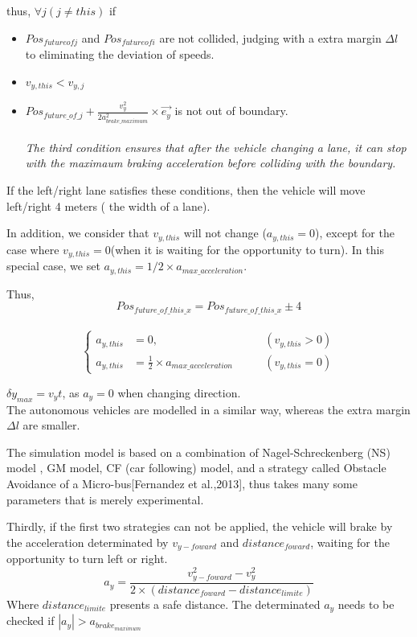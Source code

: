 \documentclass{mcmthesis}
\begin{document}
thus, $\forall j  (j \neq this) $ if
\begin{itemize}
		\item $Pos_{future of j}$ and $ Pos_{future of i}$ are not collided, judging with a extra margin $\Delta l$ to eliminating the deviation of speeds.
		\item $v_{y,this} < v_{y,j} $
		\item $Pos_{future \_ of \_ j} + \frac{v_y^2}{2a_{brake \_ maximum}^2} \times \overrightarrow{e_y}$ is not out of boundary.
		\\ \\ \emph{The third condition ensures that after the vehicle changing a lane, it can stop with the maximaum braking acceleration before colliding with the boundary. }
\end{itemize}

If the left/right lane satisfies these conditions, then the vehicle will move left/right 4 meters ( the width of a lane).


In addition, we consider that $v_{y,this}$ will not change ($a_{y,this} = 0$), except for the case where $v_{y,this} = 0$(when it is waiting for the opportunity to turn). In this special case, we set $a_{y,this} = 1/2 \times a_{max \_ acceleration}$.

Thus, \\
$$Pos_{future\_of\_this\_x} = Pos_{future\_of\_this\_x} \pm 4$$\\
$$\left\{ 
\begin{aligned}
a_{y,this} &= 0 ,   \qquad& (v_{y,this} > 0)\\
a_{y,this} &= \frac{1}{2}\times a_{max \_ acceleration} \qquad &(v_{y,this} = 0)
\end{aligned}
\right.
$$

 $\delta y_{max}=v_yt$, as $a_y=0$ when changing direction.\\


The autonomous vehicles are modelled in a similar way, whereas the extra margin $\Delta l$ are smaller. 

The simulation model is based on a combination of Nagel-Schreckenberg (NS) model \cite{acelluar}, GM model, CF (car following) model, and a strategy called Obstacle Avoidance of a Micro-bus[Fernandez et al.,2013], thus takes many some parameters that is merely experimental.

Thirdly, if the first two strategies can not be applied, the vehicle will brake by the acceleration determinated by $v_{y-{foward}}$ and $distance_{foward}$, waiting for the opportunity to turn left or right.
$$
	a_y = \frac{v_{y-foward}^2 - v_y^2}{2\times(distance_{foward} - distance_{limite})}
$$
	Where $distance_{limite}$ presents a safe distance.
	The determinated $a_y$ needs to be checked if  $|a_y| > a_{brake_{maximum}} $ 
\end{document}
